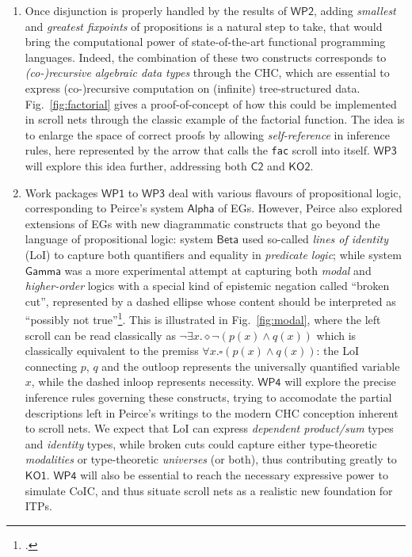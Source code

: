 \documentclass[12pt,draftproposal]{msca-pf}
\newcommand{\CH}[1]{$\mathsf{C#1}$}
\newcommand{\KO}[1]{$\mathsf{KO#1}$}
\newcommand{\WP}[1]{$\mathsf{WP#1}$}
\begin{document}
\begin{enumerate}
    \item Once disjunction is properly handled by the results of \WP{2}, adding \emph{smallest} and
    \emph{greatest fixpoints} of propositions is a natural step to take, that would bring the
    computational power of state-of-the-art functional programming languages. Indeed, the
    combination of these two constructs corresponds to \emph{(co-)recursive algebraic data types}
    through the CHC, which are essential to express (co-)recursive computation on (infinite)
    tree-structured data. Fig.~\ref{fig:factorial} gives a proof-of-concept of how this could be
    implemented in scroll nets through the classic example of the factorial function. The idea is to
    enlarge the space of correct proofs by allowing \emph{self-reference} in inference rules, here
    represented by the arrow that calls the \texttt{fac} scroll into itself. \WP{3} will explore
    this idea further, addressing both \CH{2} and \KO{2}. 

    \item Work packages \WP{1} to \WP{3} deal with various flavours of propositional logic,
    corresponding to Peirce's system $\mathsf{Alpha}$ of EGs. However, Peirce also explored
    extensions of EGs with new diagrammatic constructs that go beyond the language of propositional
    logic: system $\mathsf{Beta}$ used so-called \emph{lines of identity} (LoI) to capture both
    quantifiers and equality in \emph{predicate logic}; while system $\mathsf{Gamma}$ was a more
    experimental attempt at capturing both \emph{modal} and \emph{higher-order} logics with a
    special kind of epistemic negation called ``broken cut'', represented by a dashed ellipse whose
    content should be interpreted as ``possibly not true''\footcite{maGammaGraphCalculi2018}. This
    is illustrated in Fig.~\ref{fig:modal}, where the left scroll can be read classically as $\neg
    \exists x. \diamond \neg (p(x) \land q(x))$ which is classically equivalent to the premiss
    $\forall x. \square (p(x) \land q(x))$: the LoI connecting $p$, $q$ and the outloop represents
    the universally quantified variable $x$, while the dashed inloop represents necessity. \WP{4}
    will explore the precise inference rules governing these constructs, trying to accomodate the
    partial descriptions left in Peirce's writings to the modern CHC conception inherent to scroll
    nets. We expect that LoI can express \emph{dependent product/sum} types and \emph{identity}
    types, while broken cuts could capture either type-theoretic \emph{modalities} or type-theoretic
    \emph{universes} (or both), thus contributing greatly to \KO{1}. \WP{4} will also be essential
    to reach the necessary expressive power to simulate CoIC, and thus situate scroll nets as a
    realistic new foundation for ITPs.


\end{enumerate}
\end{document}
